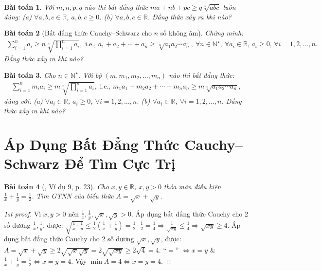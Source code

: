 \documentclass{article}
\newtheorem{baitoan}{Bài toán}
\begin{document}
\begin{baitoan}
	Với $m,n,p,q$ nào thì bất đẳng thức $ma + nb + pc\ge q\sqrt[3]{abc}$ luôn đúng: (a) $\forall a,b,c\in\mathbb{R}$, $a,b,c\ge0$. (b) $\forall a,b,c\in\mathbb{R}$. Đẳng thức xảy ra khi nào?
\end{baitoan}

\begin{baitoan}[Bất đẳng thức Cauchy--Schwarz cho $n$ số không âm]
	Chứng minh:
	\begin{align*}
		\sum_{i=1}^n a_i\ge n\sqrt[n]{\prod_{i=1}^n a_i},\mbox{ i.e., } a_1 + a_2 + \cdots + a_n\ge\sqrt[n]{a_1a_2\cdots a_n},\ \forall n\in\mathbb{N}^\star,\ \forall a_i\in\mathbb{R},\,a_i\ge0,\,\forall i = 1,2,\ldots,n.
	\end{align*}
	Đẳng thức xảy ra khi nào?
\end{baitoan}

\begin{baitoan}
	Cho $n\in\mathbb{N}^\star$. Với bộ $(m,m_1,m_2,\ldots,m_n)$ nào thì bất đẳng thức:
	\begin{align*}
		\sum_{i=1}^n m_ia_i\ge m\sqrt[n]{\prod_{i=1}^n a_i},\mbox{ i.e., } m_1a_1 + m_2a_2 + \cdots + m_na_n\ge m\sqrt[n]{a_1a_2\cdots a_n},
	\end{align*}
	đúng với: (a) $\forall a_i\in\mathbb{R}$, $a_i\ge0$, $\forall i = 1,2,\ldots,n$. (b) $\forall a_i\in\mathbb{R}$, $\forall i = 1,2,\ldots,n$.
	Đẳng thức xảy ra khi nào?
\end{baitoan}



\section{Áp Dụng Bất Đẳng Thức Cauchy--Schwarz Để Tìm Cực Trị}

\begin{baitoan}[\cite{Tuyen_Toan_9}, Ví dụ 9, p. 23]
	Cho $x,y\in\mathbb{R}$, $x,y > 0$ thỏa mãn điều kiện $\frac{1}{x} + \frac{1}{y} = \frac{1}{2}$. Tìm {\rm GTNN} của biểu thức $A = \sqrt{x} + \sqrt{y}$.
\end{baitoan}

\begin{proof}[1st proof]
	Vì $x,y > 0$ nên $\frac{1}{x},\frac{1}{y},\sqrt{x},\sqrt{y} > 0$. Áp dụng bất đẳng thức Cauchy cho 2 số dương $\frac{1}{x},\frac{1}{y}$, được: $\sqrt{\frac{1}{x}\cdot\frac{1}{y}}\le\frac{1}{2}\left(\frac{1}{x} + \frac{1}{y}\right) = \frac{1}{2}\cdot\frac{1}{2} = \frac{1}{4}\Rightarrow\frac{1}{\sqrt{xy}}\le\frac{1}{4}\Rightarrow\sqrt{xy}\ge4$. Áp dụng bất đẳng thức Cauchy cho 2 số dương $\sqrt{x},\sqrt{y}$, được: $A = \sqrt{x} + \sqrt{y}\ge2\sqrt{\sqrt{x}\sqrt{y}} = 2\sqrt{\sqrt{xy}}\ge2\sqrt{4} = 4$. ``$=$'' $\Leftrightarrow x = y$ \& $\frac{1}{x} + \frac{1}{y} = \frac{1}{2}\Leftrightarrow x = y = 4$. Vậy $\min A = 4\Leftrightarrow x = y = 4$.
\end{proof}
\end{document}
